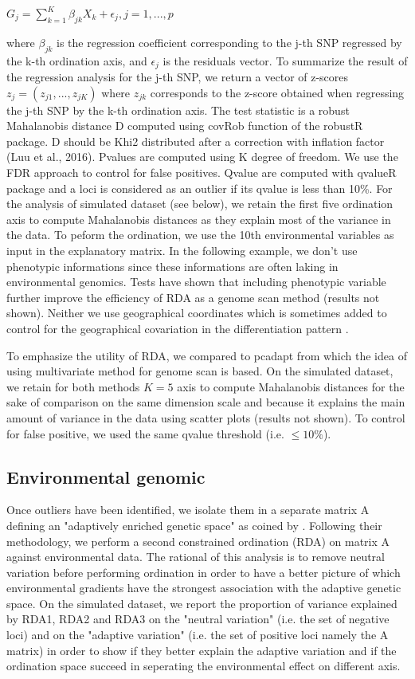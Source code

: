 \documentclass[a4paper,times,10pt,authoryear]{article}%
\begin{document}
$G_j = \sum^{K}_{k=1}\beta_{jk}X_{k}+\epsilon_{j}, j=1,...,p$

where $\beta_{jk}$ is the regression coefficient corresponding to the j-th SNP regressed by the k-th ordination axis, and $\epsilon_{j}$ is the residuals vector. To summarize the result of the regression analysis for the j-th SNP, we return a vector of z-scores $z_{j} = (z_{j1}, ..., z_{jK})$ where $z_{jk}$ corresponds to the z-score obtained when regressing the j-th SNP by the k-th ordination axis.
The test statistic is a robust Mahalanobis distance D computed using covRob function of the robustR package. D should be Khi2 distributed after a correction with inflation factor (Luu et al., 2016). Pvalues are computed using K degree of freedom. We use the FDR approach to control for false positives. Qvalue are computed with qvalueR package and a loci is considered as an outlier if its qvalue is less than 10\%.
For the analysis of simulated dataset (see below), we retain the first five ordination axis to compute Mahalanobis distances as they explain most of the variance in the data. To peform the ordination, we use the 10th environmental variables as input in the explanatory matrix. In the following example, we don't use phenotypic informations since these informations are often laking in environmental genomics. Tests have shown that including phenotypic variable further improve the efficiency of RDA as a genome scan method (results not shown). Neither we use geographical coordinates which is sometimes added to control for the geographical covariation in the differentiation pattern \citep{Frichot2013}.

To emphasize the utility of RDA, we compared to pcadapt from which the idea of using multivariate method for genome scan is based. On the simulated dataset, we retain for both methods $K=5$ axis to compute Mahalanobis distances for the sake of comparison on the same dimension scale and because it explains the main amount of variance in the data using scatter plots (results not shown). To control for false positive, we used the same qvalue threshold (i.e. $\leq 10\%$).


\subsection{Environmental genomic}

Once outliers have been identified, we isolate them in a separate matrix A defining an "adaptively enriched genetic space" as coined by \citet{Steane2014a}. Following their methodology, we perform a second constrained ordination (RDA) on matrix A against environmental data. The rational of this analysis is to remove neutral variation before performing ordination in order to have a better picture of which environmental gradients have the strongest association with the adaptive genetic space. On the simulated dataset, we report the proportion of variance explained by RDA1, RDA2 and RDA3 on the "neutral variation" (i.e. the set of negative loci) and on the "adaptive variation" (i.e. the set of positive loci namely the A matrix) in order to show if they better explain the adaptive variation and if the ordination space succeed in seperating the environmental effect on different axis.
\end{document}

